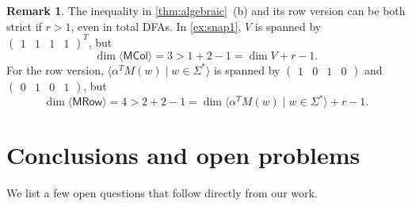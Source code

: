\documentclass[11pt,a4paper]{amsart}
\newcommand{\spn}[1]{\mathord{\langle #1 \rangle}}
\newcommand{\MCol}{\mathsf{MCol}}
\newcommand{\MRow}{\mathsf{MRow}}
\theoremstyle{plain}
\theoremstyle{definition}
\newtheorem{rem}[thm]{Remark}
\theoremstyle{defC}
\theoremstyle{thmC}
\theoremstyle{plain}
\numberwithin{equation}{section}
\begin{document}
\begin{rem}
The inequality in \autoref{thm:algebraic}~(b) and its row version can be both strict if $r>1$, even in total DFAs. In \autoref{ex:snap1}, $V$ is spanned by $\begin{pmatrix} 1 & 1 & 1 & 1\end{pmatrix}^T$, but 
\[\dim \spn{\MCol} = 3 > 1 + 2 - 1 = \dim V + r-1.\]
For the row version, $\spn{\alpha^T M(w) \mid w \in \Sigma^*}$ is spanned by 
$\begin{pmatrix}1 & 0 & 1 & 0\end{pmatrix}$ and
$\begin{pmatrix}0 & 1 & 0 & 1\end{pmatrix}$, but 
\[\dim \spn{\MRow} = 4 > 2 + 2 - 1 = \dim \spn{\alpha^T M(w) \mid w \in \Sigma^*} + r - 1.\]
\end{rem}

\section{Conclusions and open problems}\label{sec-conclusions}
We list a few open questions that follow directly from our work.
\end{document}
